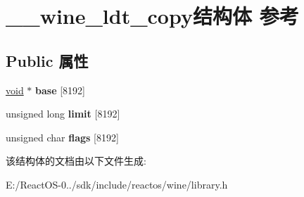 \hypertarget{struct____wine__ldt__copy}{}\section{\+\_\+\+\_\+wine\+\_\+ldt\+\_\+copy结构体 参考}
\label{struct____wine__ldt__copy}
\subsection*{Public 属性}
\begin{DoxyCompactItemize}
\item 
\mbox{\label{struct____wine__ldt__copy_a693b53e86032ca7139f83f0dba62e8a6}} 
\hyperlink{interfacevoid}{void} $\ast$ {\bfseries base} \mbox{[}8192\mbox{]}
\item 
\mbox{\label{struct____wine__ldt__copy_ab47cfcfe7e4f4831c1b61b7c4031854e}} 
unsigned long {\bfseries limit} \mbox{[}8192\mbox{]}
\item 
\mbox{\label{struct____wine__ldt__copy_a08fe85a4b9712091809588f9e018c64f}} 
unsigned char {\bfseries flags} \mbox{[}8192\mbox{]}
\end{DoxyCompactItemize}


该结构体的文档由以下文件生成\+:\begin{DoxyCompactItemize}
\item 
E\+:/\+React\+O\+S-\/0../sdk/include/reactos/wine/library.\+h\end{DoxyCompactItemize}
